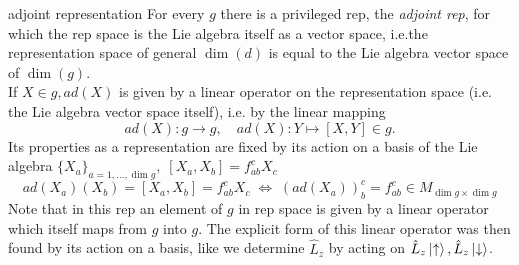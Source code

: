 \begin{mybox}{adjoint representation}
	 For every $g$ there is a privileged rep, the \emph{adjoint rep}, for which the rep space is the Lie algebra itself as a vector space, i.e.the representation space of general $\dim(d)$ is equal to the Lie algebra vector space of $\dim(g)$.\\
	 If $X\in g, ad(X)$ is given by a linear operator on the representation space (i.e. the Lie algebra vector space itself), i.e. by the linear mapping
	 \begin{equation}
	 	ad(X):g\rightarrow g,\quad ad(X): Y\mapsto [X,Y] \in g.
	 \end{equation}
	 Its properties as a representation are fixed by its action on a basis of the Lie algebra $\{X_a\}_{a=1,\dots,\dim g}, \; [X_a,X_b] = f^c_{ab} X_c$
	 \begin{equation}
	 	ad(X_a)(X_b) = [X_a,X_b] = f^c_{ab} X_c \; \Leftrightarrow \; (ad(X_a))^c_b = f^c_{ab} \in M_{\dim g\times \dim g}
	 \end{equation}
	 Note that in this rep an element of $g$ in rep space is given by a linear operator which itself maps from $g$ into $g$. The explicit form of this linear operator was then found by its action on a basis, like we determine $\hat{ L}_z$ by acting on $\hat{ L}_z \ket{\uparrow}, \hat{ L}_z \ket{\downarrow}$.
\end{mybox}
